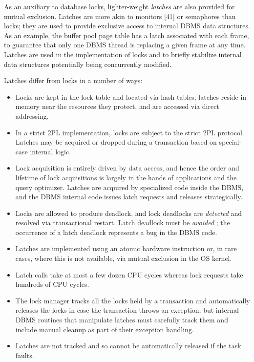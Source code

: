 \documentclass[a4paper,11pt,twoside,openright]{book}
\begin{document}
As an auxiliary to database locks, lighter-weight \emph{latches} are
also provided for mutual exclusion. Latches are more akin to monitors
{[}41{]} or semaphores than locks; they are used to provide exclusive
access to internal DBMS data structures. As an example, the buffer pool
page table has a latch associated with each frame, to guarantee that
only one DBMS thread is replacing a given frame at any time. Latches are
used in the implementation of locks and to briefly stabilize internal
data structures potentially being concurrently modified.

Latches differ from locks in a number of ways:

\begin{itemize}
\item
  Locks are kept in the lock table and located via hash tables; latches
  reside in memory near the resources they protect, and are accessed via
  direct addressing.

  \item
    In a strict 2PL implementation, locks are subject to the strict 2PL
    protocol. Latches may be acquired or dropped during a transaction
    based on special-case internal logic.
  \item
    Lock acquisition is entirely driven by data access, and hence the
    order and lifetime of lock acquisitions is largely in the hands of
    applications and the query optimizer. Latches are acquired by
    specialized code inside the DBMS, and the DBMS internal code issues
    latch requests and releases strategically.
  \item
    Locks are allowed to produce deadlock, and lock deadlocks are
    \emph{detected} and resolved via transactional restart. Latch
    deadlock must be \emph{avoided} ; the occurrence of a latch
    deadlock represents a bug in the DBMS code.
  \item
    Latches are implemented using an atomic hardware instruction or, in
    rare cases, where this is not available, via mutual exclusion in the
    OS kernel.
  \item
    Latch calls take at most a few dozen CPU cycles whereas lock
    requests take hundreds of CPU cycles.
  \item
    The lock manager tracks all the locks held by a transaction and
    automatically releases the locks in case the transaction throws an
    exception, but internal DBMS routines that manipulate latches must
    carefully track them and include manual cleanup as part of their
    exception handling.
  \item
    Latches are not tracked and so cannot be automatically released if
    the task faults.
\end{itemize}
\end{document}

